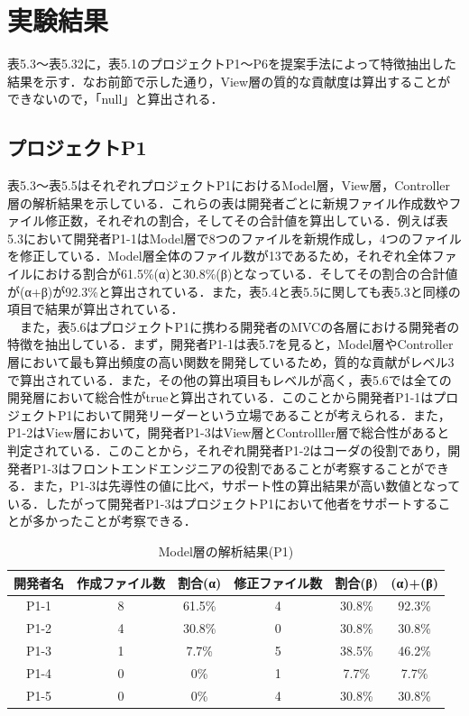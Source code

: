 \documentclass{funthesis}
\begin{document}
\section{実験結果}
表5.3〜表5.32に，表5.1のプロジェクトP1〜P6を提案手法によって特徴抽出した結果を示す．なお前節で示した通り，View層の質的な貢献度は算出することができないので，「null」と算出される．
\subsection{プロジェクトP1}
表5.3〜表5.5はそれぞれプロジェクトP1におけるModel層，View層，Controller層の解析結果を示している．これらの表は開発者ごとに新規ファイル作成数やファイル修正数，それぞれの割合，そしてその合計値を算出している．例えば表5.3において開発者P1-1はModel層で8つのファイルを新規作成し，4つのファイルを修正している．Model層全体のファイル数が13であるため，それぞれ全体ファイルにおける割合が61.5\%(α)と30.8\%(β)となっている．そしてその割合の合計値が(α+β)が92.3\%と算出されている．また，表5.4と表5.5に関しても表5.3と同様の項目で結果が算出されている．
　\\　また，表5.6はプロジェクトP1に携わる開発者のMVCの各層における開発者の特徴を抽出している．まず，開発者P1-1は表5.7を見ると，Model層やController層において最も算出頻度の高い関数を開発しているため，質的な貢献がレベル3で算出されている．また，その他の算出項目もレベルが高く，表5.6では全ての開発層において総合性がtrueと算出されている．このことから開発者P1-1はプロジェクトP1において開発リーダーという立場であることが考えられる．また，P1-2はView層において，開発者P1-3はView層とControlller層で総合性があると判定されている．このことから，それぞれ開発者P1-2はコーダの役割であり，開発者P1-3はフロントエンドエンジニアの役割であることが考察することができる．また，P1-3は先導性の値に比べ，サポート性の算出結果が高い数値となっている．したがって開発者P1-3はプロジェクトP1において他者をサポートすることが多かったことが考察できる．
\begin{table}[H]
  \begin{center}
\begin{tabular}{|c|c|c|c|c||c|}\hline
開発者名&作成ファイル数&割合(α)&修正ファイル数&割合(β)&(α)+(β)\\ \hline
P1-1 & 8 & 61.5\% & 4 & 30.8\% & 92.3\%\\ \hline \hline
P1-2 & 4 & 30.8\% & 0 & 30.8\% & 30.8\%\\ \hline \hline
P1-3 & 1 & 7.7\% & 5 & 38.5\% & 46.2\%\\ \hline \hline
P1-4 & 0 & 0\% & 1 & 7.7\% & 7.7\%\\ \hline \hline
P1-5 & 0 & 0\% & 4 & 30.8\% & 30.8\%\\ \hline \hline
\end{tabular}    
\caption{Model層の解析結果(P1)}    \label{sample}
  \end{center}
\end{table}
\end{document}

